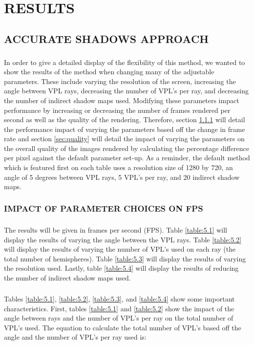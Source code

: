 \chapter{RESULTS}

\section{ACCURATE SHADOWS APPROACH}
\paragraph{}
In order to give a detailed display of the flexibility of this method, we wanted to show the results of the method when changing many of the adjustable parameters.  These include varying the resolution of the screen, increasing the angle between VPL rays, decreasing the number of VPL's per ray, and decreasing the number of indirect shadow maps used. Modifying these parameters impact performance by increasing or decreasing the number of frames rendered per second as well as the quality of the rendering.  Therefore, section \ref{sec:fps} will detail the performance impact of varying the parameters based off the change in frame rate and section \ref{sec:quality} will detail the impact of varying the parameters on the overall quality of the images rendered by calculating the percentage difference per pixel against the default parameter set-up.  As a reminder, the default method which is featured first on each table uses a resolution size of 1280 by 720, an angle of 5 degrees between VPL rays, 5 VPL's per ray, and 20 indirect shadow maps.

\subsection{IMPACT OF PARAMETER CHOICES ON FPS} \label{sec:fps}
\paragraph{}
The results will be given in frames per second (FPS).  Table \ref{table:5.1} will display the results of varying the angle between the VPL rays. Table \ref{table:5.2} will display the results of varying the number of VPL's used on each ray (the total number of hemispheres). Table \ref{table:5.3} will display the results of varying the resolution used.  Lastly, table \ref{table:5.4} will display the results of reducing the number of indirect shadow maps used.

\paragraph{}
Tables \ref{table:5.1}, \ref{table:5.2}, \ref{table:5.3}, and \ref{table:5.4} show some important characteristics.  First, tables \ref{table:5.1} and \ref{table:5.2} show the impact of the angle between rays and the number of VPL's per ray on the total number of VPL's used.  The equation to calculate the total number of VPL's based off the angle and the number of VPL's per ray used is:

